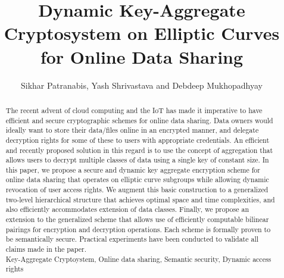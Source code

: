 \documentclass{class/llncs}
\title{Dynamic Key-Aggregate Cryptosystem on Elliptic Curves for Online Data Sharing}
\begin{document}
% 

\author{Sikhar Patranabis, Yash Shrivastava and Debdeep Mukhopadhyay}
\maketitle
{}


\begin{abstract}
The recent advent of cloud computing and the IoT has made it imperative to have efficient and secure cryptographic schemes for online data sharing. Data owners would ideally want to store their data/files online in an encrypted manner, and delegate decryption rights for some of these to users with appropriate credentials. An efficient and recently proposed solution in this regard is to use the concept of aggregation that allows users to decrypt multiple classes of data using a single key of constant size. In this paper, we propose a secure and dynamic key aggregate encryption scheme for online data sharing that operates on elliptic curve subgroups while allowing dynamic revocation of user access rights. We augment this basic construction to a generalized two-level hierarchical structure that achieves optimal space and time complexities, and also efficiently accommodates extension of data classes. Finally, we propose an extension to the generalized scheme that allows use of efficiently computable bilinear 
pairings for encryption and decryption operations. Each scheme is formally proven to be semantically secure. Practical experiments have been conducted to validate all claims made in the paper.\\
 Key-Aggregate Cryptoystem, Online data sharing, Semantic security, Dynamic access rights
\end{abstract}










\begin{scriptsize}


\end{scriptsize}

\newpage
% 
\end{document}
